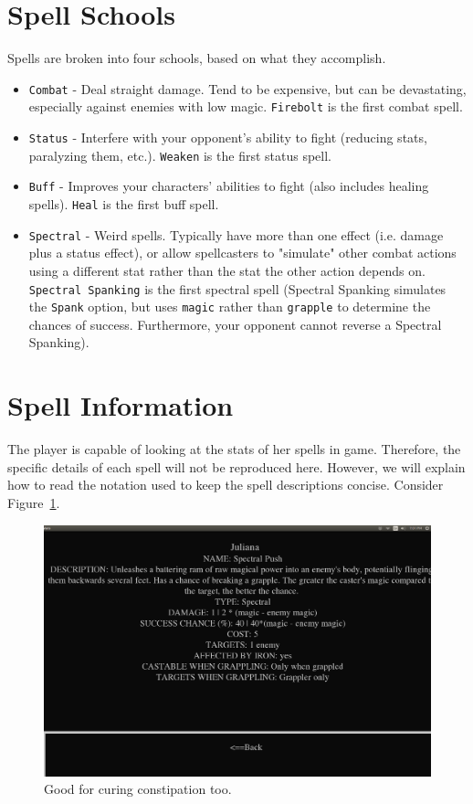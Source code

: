 \documentclass{report}
\begin{document}
\section{Spell Schools}
\label{sec_schools}
Spells are broken into four schools, based on what they accomplish.
\begin{itemize}
    \item \verb|Combat| - Deal straight damage. Tend to be expensive, but can be devastating, especially against enemies with low magic. \verb|Firebolt| is the first 
    combat spell.
    \item \verb|Status| - Interfere with your opponent's ability to fight (reducing stats, paralyzing them, etc.). \verb|Weaken| is the first status spell.
    \item \verb|Buff| - Improves your characters' abilities to fight (also includes healing spells). \verb|Heal| is the first buff spell.
    \item \verb|Spectral| - Weird spells. Typically have more than one effect (i.e. damage plus a status effect), or allow spellcasters to "simulate" other combat actions using a different stat rather than the stat the other action depends on. \verb|Spectral Spanking| is the first spectral spell (Spectral Spanking simulates the \verb|Spank| 
    option, but uses \verb|magic| rather than \verb|grapple| to determine the chances of success. Furthermore, your opponent cannot reverse a Spectral Spanking).
\end{itemize}

\section{Spell Information}

The player is capable of looking at the stats of her spells in game. Therefore, the specific details of each spell will not be reproduced here. However, we will explain
how to read the notation used to keep the spell descriptions concise. Consider Figure~\ref{fig_spell}.

\begin{figure}[h!]
    \includegraphics[width=\textwidth]{spell}
    \caption{Good for curing constipation too.}
    \label{fig_spell}
\end{figure}
\end{document}
